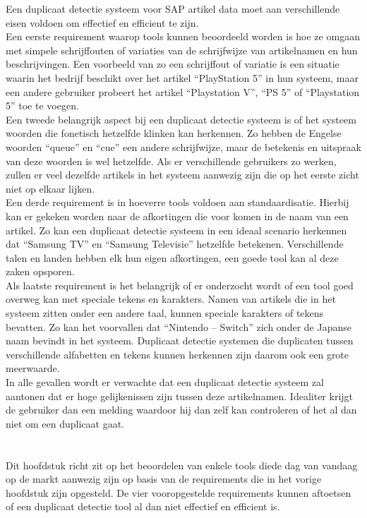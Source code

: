 Een duplicaat detectie systeem voor SAP artikel data moet aan verschillende eisen voldoen om effectief en efficient te zijn.
\\Een eerste requirement waarop tools kunnen beoordeeld worden is hoe ze omgaan met simpele schrijffouten of variaties van de schrijfwijze van artikelnamen en hun beschrijvingen. Een voorbeeld van zo een schrijffout of variatie is een situatie waarin het bedrijf beschikt over het artikel “PlayStation 5” in hun systeem, maar een andere gebruiker probeert het artikel “Playstation V”, “PS 5” of “Playstation 5”  toe te voegen.
\\Een tweede belangrijk aspect bij een duplicaat detectie systeem is of het systeem woorden die fonetisch hetzelfde klinken kan herkennen. Zo hebben de Engelse woorden “queue” en “cue” een andere schrijfwijze, maar de betekenis en uitspraak van deze woorden is wel hetzelfde. Als er verschillende gebruikers zo werken, zullen er veel dezelfde artikels in het systeem aanwezig zijn die op het eerste zicht niet op elkaar lijken.
\\Een derde requirement is in hoeverre tools voldoen aan standaardisatie. Hierbij kan er gekeken worden naar de afkortingen die voor komen in de naam van een artikel. Zo kan een duplicaat detectie systeem in een ideaal scenario herkennen dat “Samsung TV” en “Samsung Televisie” hetzelfde betekenen. Verschillende talen en landen hebben elk hun eigen afkortingen, een goede tool kan al deze zaken opsporen.
\\Als laatste requirement is het belangrijk of er onderzocht wordt of een tool goed overweg kan met speciale tekens en karakters. Namen van artikels die in het systeem zitten onder een andere taal, kunnen speciale karakters of tekens bevatten. Zo kan het voorvallen dat “Nintendo – Switch” zich onder de Japanse naam bevindt in het systeem. Duplicaat detectie systemen die duplicaten tussen verschillende alfabetten en tekens kunnen herkennen zijn daarom ook een grote meerwaarde. 
\\In alle gevallen wordt er verwachte dat een duplicaat detectie systeem zal aantonen dat er hoge gelijkenissen zijn tussen deze artikelnamen. Idealiter krijgt de gebruiker dan een melding waardoor hij dan zelf kan controleren of het al dan niet om een duplicaat gaat.

\section{}%
\label{sec:tools}
Dit hoofdstuk richt zit op het beoordelen van enkele tools diede dag van vandaag op de markt aanwezig zijn op basis van de requirements die in het vorige hoofdstuk zijn opgesteld. De vier vooropgestelde requirements kunnen aftoetsen of een duplicaat detectie tool al dan niet effectief en efficient is.

